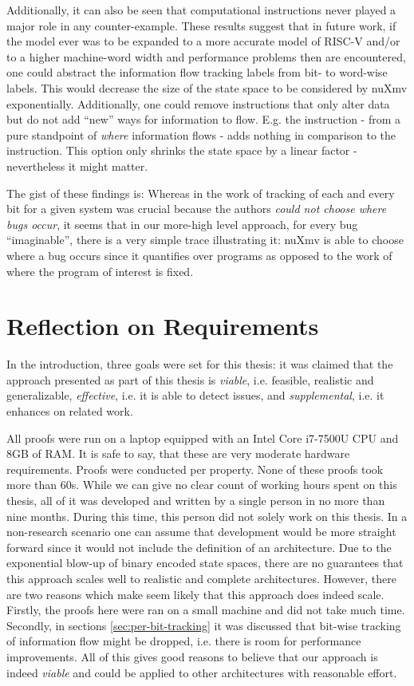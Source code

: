 Additionally, it can also be seen that computational instructions never played a major role in any counter-example.
These results suggest that in future work, if the model ever was to be expanded to a more accurate model of RISC-V and/or to a higher machine-word width and performance problems then are encountered, one could abstract the information flow tracking labels from bit- to word-wise labels.
This would decrease the size of the state space to be considered by nuXmv exponentially.
Additionally, one could remove instructions that only alter data but do not add \enquote{new} ways for information to flow.
E.g. the  instruction - from a pure standpoint of \textit{where} information flows - adds nothing in comparison to the  instruction.
This option only shrinks the state space by a linear factor - nevertheless it might matter.

The gist of these findings is:
Whereas in the work of \citeauthor{Ferraiuolo17} \cite{Ferraiuolo17} tracking of each and every bit for a given system was crucial because the authors \textit{could not choose where bugs occur}, it seems that in our more-high level approach, for every bug \enquote{imaginable}, there is a very simple trace illustrating it: nuXmv is able to choose where a bug occurs since it quantifies over programs as opposed to the work of \citeauthor{Ferraiuolo17} where the program of interest is fixed.

\section{Reflection on Requirements}
\label{sec:discuss-requirements}

In the introduction, three goals were set for this thesis: it was claimed that the approach presented as part of this thesis is \textit{viable}, i.e. feasible, realistic and generalizable, \textit{effective}, i.e. it is able to detect issues, and \textit{supplemental}, i.e. it enhances on related work.

All proofs were run on a laptop equipped with an Intel Core i7-7500U CPU and 8GB of RAM.
It is safe to say, that these are very moderate hardware requirements.
Proofs were conducted per property.
None of these proofs took more than 60s.
While we can give no clear count of working hours spent on this thesis, all of it was developed and written by a single person in no more than nine months.
During this time, this person did not solely work on this thesis.
In a non-research scenario one can assume that development would be more straight forward since it would not include the definition of an architecture.
Due to the exponential blow-up of binary encoded state spaces, there are no guarantees that this approach scales well to realistic and complete architectures.
However, there are two reasons which make seem likely that this approach does indeed scale.
Firstly, the proofs here were ran on a small machine and did not take much time.
Secondly, in sections \ref{sec:per-bit-tracking} it was discussed that bit-wise tracking of information flow might be dropped, i.e. there is room for performance improvements.
All of this gives good reasons to believe that our approach is indeed \textit{viable} and could be applied to other architectures with reasonable effort.

